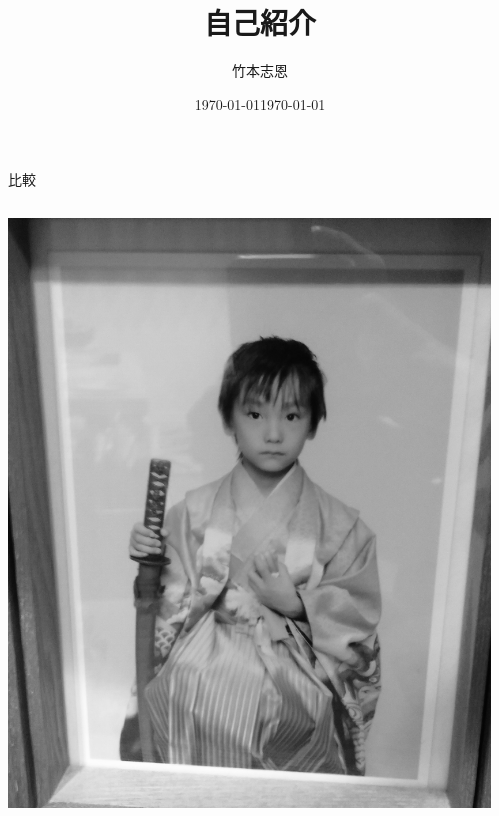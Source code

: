 \documentclass[unicode,12pt,aspectratio=169, dvipdfmx]{beamer}
\title{自己紹介}
\author{竹本志恩}
\date{\today}
\date[]{\today}
\institute{INIAD}
\begin{document}
    \frame{\maketitle}

    \begin{frame}{比較}
        \begin{columns}
            \begin{column}{.5\linewidth}
                \begin{center}
                    \includegraphics[scale=0.065]{figures/before.jpeg}
                \end{center}
            \end{column}
            \begin{column}{.5\linewidth}
                \begin{center}

\end{center}
\end{column}
\end{columns}
\end{frame}
\end{document}
